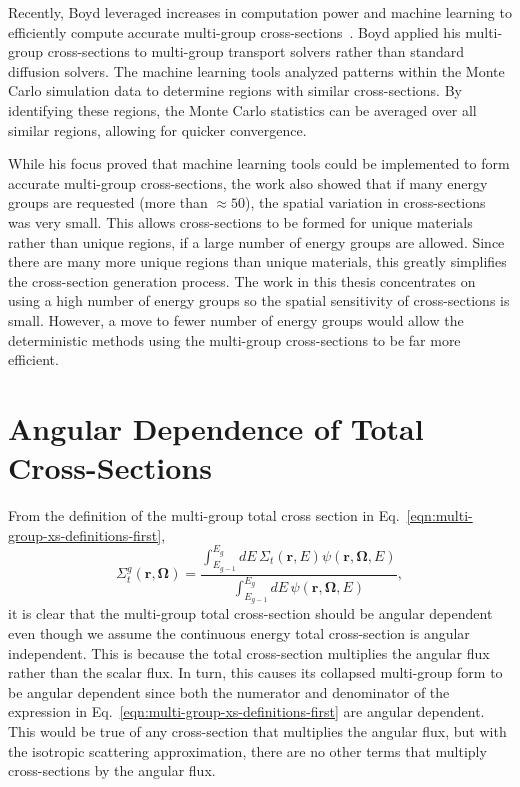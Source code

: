Recently, Boyd leveraged increases in computation power and machine learning to efficiently compute accurate multi-group cross-sections~\cite{boyd2017thesis}. Boyd applied his multi-group cross-sections to multi-group transport solvers rather than standard diffusion solvers. The machine learning tools analyzed patterns within the Monte Carlo simulation data to determine regions with similar cross-sections. By identifying these regions, the Monte Carlo statistics can be averaged over all similar regions, allowing for quicker convergence. 

While his focus proved that machine learning tools could be implemented to form accurate multi-group cross-sections, the work also showed that if many energy groups are requested (more than $\approx50$), the spatial variation in cross-sections was very small. This allows cross-sections to be formed for unique materials rather than unique regions, if a large number of energy groups are allowed. Since there are many more unique regions than unique materials, this greatly simplifies the cross-section generation process. The work in this thesis concentrates on using a high number of energy groups so the spatial sensitivity of cross-sections is small. However, a move to fewer number of energy groups would allow the deterministic methods using the multi-group cross-sections to be far more efficient.


\section{Angular Dependence of Total Cross-Sections}
\label{sec:mgxs-angular-dependence}

From the definition of the multi-group total cross section in Eq.~\ref{eqn:multi-group-xs-definitions-first}, 
\begin{equation*}
	\Sigma_{t}^g(\mathbf{r},\mathbf{\Omega}) = \frac{\int_{E_{g-1}}^{E_g} dE \, \Sigma_{t}(\mathbf{r},E)\psi(\mathbf{r},\mathbf{\Omega},E)}{\int_{E_{g-1}}^{E_g} dE \, \psi(\mathbf{r},\mathbf{\Omega},E)} ,
\end{equation*}
it is clear that the multi-group total cross-section should be angular dependent even though we assume the continuous energy total cross-section is angular independent. This is because the total cross-section multiplies the angular flux rather than the scalar flux. In turn, this causes its collapsed multi-group form to be angular dependent since both the numerator and denominator of the expression in Eq.~\ref{eqn:multi-group-xs-definitions-first} are angular dependent. This would be true of any cross-section that multiplies the angular flux, but with the isotropic scattering approximation, there are no other terms that multiply cross-sections by the angular flux.

